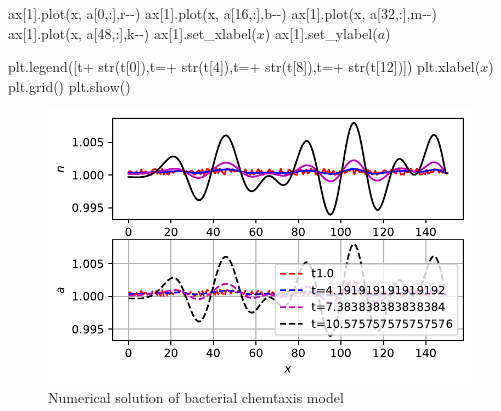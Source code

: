 \documentclass[
  letterpaper,
  DIV=11,
  numbers=noendperiod]{scrreprt}
\newenvironment{Shaded}{\begin{snugshade}}{\end{snugshade}}
\newcommand{\BuiltInTok}[1]{\textcolor[rgb]{0.00,0.23,0.31}{#1}}
\newcommand{\DecValTok}[1]{\textcolor[rgb]{0.68,0.00,0.00}{#1}}
\newcommand{\NormalTok}[1]{\textcolor[rgb]{0.00,0.23,0.31}{#1}}
\newcommand{\OperatorTok}[1]{\textcolor[rgb]{0.37,0.37,0.37}{#1}}
\newcommand{\StringTok}[1]{\textcolor[rgb]{0.13,0.47,0.30}{#1}}
\theoremstyle{plain}
\theoremstyle{definition}
\theoremstyle{plain}
\theoremstyle{remark}
\begin{document}
\begin{Shaded}
\begin{Highlighting}[]
\NormalTok{ax[}\DecValTok{1}\NormalTok{].plot(x, a[}\DecValTok{0}\NormalTok{,:],}\StringTok{\textquotesingle{}r{-}{-}\textquotesingle{}}\NormalTok{)}
\NormalTok{ax[}\DecValTok{1}\NormalTok{].plot(x, a[}\DecValTok{16}\NormalTok{,:],}\StringTok{\textquotesingle{}b{-}{-}\textquotesingle{}}\NormalTok{)}
\NormalTok{ax[}\DecValTok{1}\NormalTok{].plot(x, a[}\DecValTok{32}\NormalTok{,:],}\StringTok{\textquotesingle{}m{-}{-}\textquotesingle{}}\NormalTok{)}
\NormalTok{ax[}\DecValTok{1}\NormalTok{].plot(x, a[}\DecValTok{48}\NormalTok{,:],}\StringTok{\textquotesingle{}k{-}{-}\textquotesingle{}}\NormalTok{)}
\NormalTok{ax[}\DecValTok{1}\NormalTok{].set\_xlabel(}\StringTok{\textquotesingle{}$x$\textquotesingle{}}\NormalTok{)}
\NormalTok{ax[}\DecValTok{1}\NormalTok{].set\_ylabel(}\StringTok{\textquotesingle{}$a$\textquotesingle{}}\NormalTok{)}

\NormalTok{plt.legend([}\StringTok{\textquotesingle{}t\textquotesingle{}}\OperatorTok{+} \BuiltInTok{str}\NormalTok{(t[}\DecValTok{0}\NormalTok{]),}\StringTok{\textquotesingle{}t=\textquotesingle{}}\OperatorTok{+} \BuiltInTok{str}\NormalTok{(t[}\DecValTok{4}\NormalTok{]),}\StringTok{\textquotesingle{}t=\textquotesingle{}}\OperatorTok{+} \BuiltInTok{str}\NormalTok{(t[}\DecValTok{8}\NormalTok{]),}\StringTok{\textquotesingle{}t=\textquotesingle{}}\OperatorTok{+} \BuiltInTok{str}\NormalTok{(t[}\DecValTok{12}\NormalTok{])])}
\NormalTok{plt.xlabel(}\StringTok{\textquotesingle{}$x$\textquotesingle{}}\NormalTok{)}
\NormalTok{plt.grid()}
\NormalTok{plt.show()}
\end{Highlighting}
\end{Shaded}

\begin{figure}[H]

{\centering \includegraphics{BacterialChemotaxis_files/figure-pdf/fig-bacterialchemotaxispde-output-1.pdf}

}

\caption{\label{fig-bacterialchemotaxispde}Numerical solution of
bacterial chemtaxis model}

\end{figure}
\end{document}
